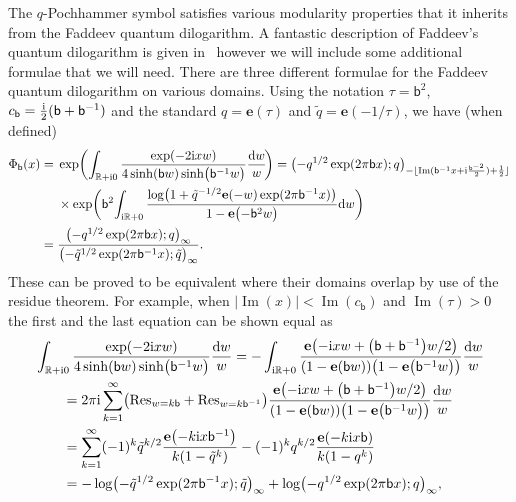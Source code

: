 \documentclass[pdftex]{sigma}
\numberwithin{equation}{section}
\def\BR{\mathbb{R}}
\def\tq{\tilde{q}}
\def\e{\mathbf e}
\def\BR{\mathbb R}
\def\tq{\tilde{q}}
\def\Im{\operatorname{Im}}
\begin{document}
The $q$-Pochhammer symbol satisfies various modularity properties that it inherits from the Faddeev quantum dilogarithm. A fantastic description of Faddeev's quantum dilogarithm is given in~\cite[Appendix A]{AK:I} however we will include some additional formulae that we will need. There are three different formulae for the Faddeev quantum dilogarithm on various domains. Using the notation $\tau=\mathsf{b}^{2}$, $c_{\mathsf{b}}=\frac{{\rm i}}{2}(\mathsf{b}+\mathsf{b}^{-1})$ and the standard $q=\e(\tau)$ and $\tq=\e(-1/\tau)$, we have (when defined)
\begin{align*}
 \Phi_{\mathsf{b}}(x)
 ={}&
 \exp\biggl(\int_{\BR+{\rm i}0}\frac{\exp(-2{\rm i}xw)}{4\sinh(\mathsf{b}w)\sinh\bigl(\mathsf{b}^{-1}w\bigr)}\frac{{\rm d}w}{w}\!\biggr)
 =
 \bigl(-q^{1/2}\exp(2\pi\mathsf{b}x);q\bigr)_{-\lfloor\Im(\mathsf{b}^{-1}x+{\rm i}\frac{\mathsf{b}^{-2}}{2})+\frac{1}{2}\rfloor}\\
 & \times\exp\biggl(\mathsf{b}^{2}\!\int_{{\rm i}\BR+0}\frac{\log\bigl(1+\tq^{-1/2}\e(-w)\exp(2\pi\mathsf{b}^{-1}x)\bigr)}{1-\e\bigl(-\mathsf{b}^{2}w\bigr)}{\rm d}w\biggr)
 \\
 ={}&
 \frac{\bigl(-q^{1/2}\exp(2\pi\mathsf{b}x);q\bigr)_{\infty}}{\bigl(-\tq^{1/2}\exp(2\pi\mathsf{b}^{-1}x);\tq\bigr)_{\infty}}
  .
\end{align*}
These can be proved to be equivalent where their domains overlap by use of the residue theorem. For example, when $|\Im(x)|<\Im(c_{\mathsf{b}})$ and $\Im(\tau)>0$ the first and the last equation can be shown equal as
\begin{align*}
 &\int_{\BR+{\rm i}0}\frac{\exp(-2{\rm i}xw)}{4\sinh(\mathsf{b}w)\sinh\bigl(\mathsf{b}^{-1}w\bigr)}\frac{{\rm d}w}{w}
   =-\int_{{\rm i}\BR+0}\frac{\e\bigl(-{\rm i}xw+\bigl(\mathsf{b}+\mathsf{b}^{-1}\bigr)w/2\bigr)}{(1-\e(\mathsf{b}w))\bigl(1-\e\bigl(\mathsf{b}^{-1}w\bigr)\bigr)}\frac{{\rm d}w}{w}\\
 & \qquad{} =2\pi {\rm i}\sum_{k=1}^{\infty}\bigl(\mathrm{Res}_{w=k\mathsf{b}}+\mathrm{Res}_{w=k\mathsf{b}^{-1}}\bigr)\frac{\e\bigl(-{\rm i} xw+\bigl(\mathsf{b}+\mathsf{b}^{-1}\bigr)w/2\bigr)}{(1-\e(\mathsf{b}w))\bigl(1-\e\bigl(\mathsf{b}^{-1}w\bigr)\bigr)}\frac{{\rm d}w}{w}\\
 & \qquad{}=
 \sum_{k=1}^{\infty}(-1)^{k}\tq^{k/2}\frac{\e\bigl(-k{\rm i}x\mathsf{b}^{-1}\bigr)}{k(1-\tq^{k})}-(-1)^{k}q^{k/2}\frac{\e(-k{\rm i}x\mathsf{b})}{k(1-q^{k})}\\
 & \qquad{} =
 -\log\bigl(-\tq^{1/2}\exp(2\pi\mathsf{b}^{-1}x);\tq\bigr)_{\infty}+\log\bigl(-q^{1/2}\exp(2\pi\mathsf{b}x);q\bigr)_{\infty},
\end{align*}
\end{document}
